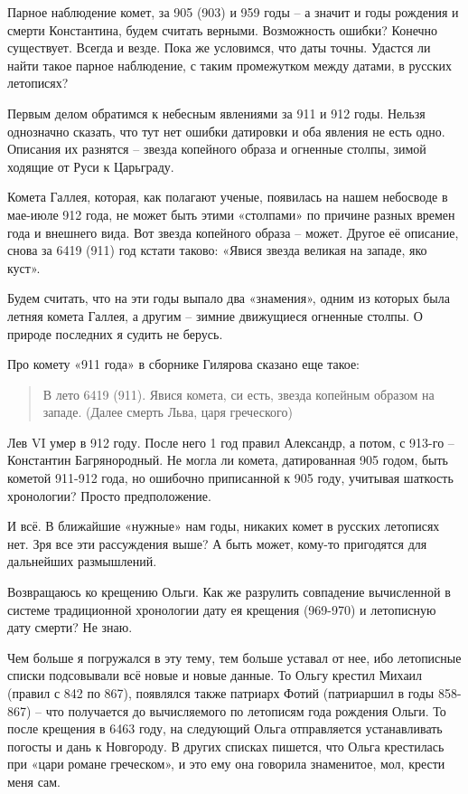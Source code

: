 Парное наблюдение комет, за 905 (903) и 959 годы – а значит и годы рождения и смерти Константина, будем считать верными. Возможность ошибки? Конечно существует. Всегда и везде. Пока же условимся, что даты точны. Удастся ли найти такое парное наблюдение, с таким промежутком между датами, в русских летописях?

Первым делом обратимся к небесным явлениями за 911 и 912 годы. Нельзя однозначно сказать, что тут нет ошибки датировки и оба явления не есть одно. Описания их разнятся – звезда копейного образа и огненные столпы, зимой ходящие от Руси к Царьграду.

Комета Галлея, которая, как полагают ученые, появилась на нашем небосводе в мае-июле 912 года, не может быть этими «столпами» по причине разных времен года и внешнего вида. Вот звезда копейного образа – может. Другое её описание, снова за 6419 (911) год кстати таково: «Явися звезда великая на западе, яко куст».

Будем считать, что на эти годы выпало два «знамения», одним из которых была летняя комета Галлея, а другим – зимние движущиеся огненные столпы. О природе последних я судить не берусь.

Про комету «911 года» в сборнике Гилярова сказано еще такое:

\begin{quotation}
В лето 6419 (911). Явися комета, си есть, звезда копейным образом на западе. (Далее смерть Льва, царя греческого)
\end{quotation}

Лев VI умер в 912 году. После него 1 год правил Александр, а потом, с 913-го – Константин Багрянородный. Не могла ли комета, датированная 905 годом, быть кометой 911-912 года, но ошибочно приписанной к 905 году, учитывая шаткость хронологии? Просто предположение.

И всё. В ближайшие «нужные» нам годы, никаких комет в русских летописях нет. Зря все эти рассуждения выше? А быть может, кому-то пригодятся для дальнейших размышлений. 

Возвращаюсь ко крещению Ольги. Как же разрулить совпадение вычисленной в системе традиционной хронологии дату ея крещения (969-970) и летописную дату смерти? Не знаю.

Чем больше я погружался в эту тему, тем больше уставал от нее, ибо летописные списки подсовывали всё новые и новые данные. То Ольгу крестил Михаил (правил с 842 по 867), появлялся также патриарх Фотий (патриаршил в годы 858-867) – что получается до вычисляемого по летописям года рождения Ольги. То после крещения в 6463 году, на следующий Ольга отправляется устанавливать погосты и дань к Новгороду. В других списках пишется, что Ольга крестилась при «цари романе греческом», и это ему она говорила знаменитое, мол, крести меня сам.

